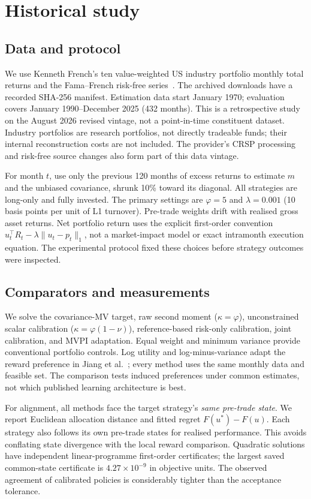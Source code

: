 \documentclass[sigconf,review]{acmart}
\begin{document}
\section{Historical study}
\subsection{Data and protocol}
We use Kenneth French's ten value-weighted US industry portfolio monthly total returns and the Fama--French risk-free series\ \cite{french}. The archived downloads have a recorded SHA-256 manifest. Estimation data start January 1970; evaluation covers January 1990--December 2025 (432 months). This is a retrospective study on the August 2026 revised vintage, not a point-in-time constituent dataset. Industry portfolios are research portfolios, not directly tradeable funds; their internal reconstruction costs are not included. The provider's CRSP processing and risk-free source changes also form part of this data vintage.

For month $t$, use only the previous 120 months of excess returns to estimate $m$ and the unbiased covariance, shrunk 10\% toward its diagonal. All strategies are long-only and fully invested. The primary settings are $\varphi=5$ and $\lambda=0.001$ (10 basis points per unit of L1 turnover). Pre-trade weights drift with realised gross asset returns. Net portfolio return uses the explicit first-order convention $u_t^\top R_t-\lambda\|u_t-p_t\|_1$, not a market-impact model or exact intramonth execution equation. The experimental protocol fixed these choices before strategy outcomes were inspected.

\subsection{Comparators and measurements}
We solve the covariance-MV target, raw second moment ($\kappa=\varphi$), unconstrained scalar calibration ($\kappa=\varphi(1-\nu)$), reference-based risk-only calibration, joint calibration, and MVPI adaptation. Equal weight and minimum variance provide conventional portfolio controls. Log utility and log-minus-variance adapt the reward preference in Jiang et al.\ \cite{jiang2025}; every method uses the same monthly data and feasible set. The comparison tests induced preferences under common estimates, not which published learning architecture is best.

For alignment, all methods face the target strategy's \emph{same pre-trade state}. We report Euclidean allocation distance and fitted regret $F(u^*)-F(u)$. Each strategy also follows its own pre-trade states for realised performance. This avoids conflating state divergence with the local reward comparison. Quadratic solutions have independent linear-programme first-order certificates; the largest saved common-state certificate is $4.27\times10^{-9}$ in objective units. The observed agreement of calibrated policies is considerably tighter than the acceptance tolerance.
\end{document}
